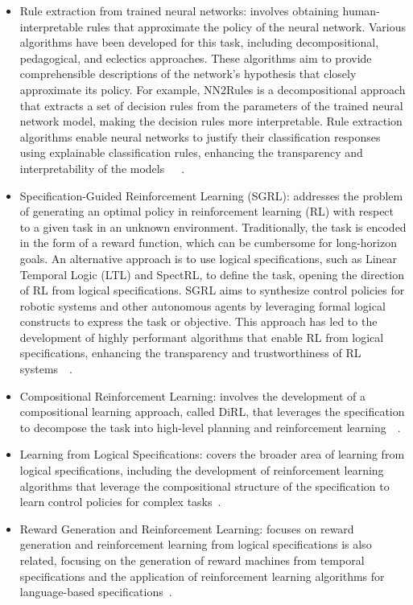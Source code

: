 \documentclass[runningheads]{llncs}
\begin{document}
\begin{itemize}
    \item Rule extraction from trained neural networks: involves obtaining human-interpretable rules that approximate the policy of the neural network. Various algorithms have been developed for this task, including decompositional, pedagogical, and eclectics approaches. These algorithms aim to provide comprehensible descriptions of the network's hypothesis that closely approximate its policy. For example, NN2Rules is a decompositional approach that extracts a set of decision rules from the parameters of the trained neural network model, making the decision rules more interpretable. Rule extraction algorithms enable neural networks to justify their classification responses using explainable classification rules, enhancing the transparency and interpretability of the models~\cite{Hailesilassie2016}~\cite{Sato2001}~\cite{Lal2022}.
    \item Specification-Guided Reinforcement Learning (SGRL): addresses the problem of generating an optimal policy in reinforcement learning (RL) with respect to a given task in an unknown environment. Traditionally, the task is encoded in the form of a reward function, which can be cumbersome for long-horizon goals. An alternative approach is to use logical specifications, such as Linear Temporal Logic (LTL) and SpectRL, to define the task, opening the direction of RL from logical specifications. SGRL aims to synthesize control policies for robotic systems and other autonomous agents by leveraging formal logical constructs to express the task or objective. This approach has led to the development of highly performant algorithms that enable RL from logical specifications, enhancing the transparency and trustworthiness of RL systems~\cite{Bansal2022}~\cite{Jothimurugan2023}.
    \item Compositional Reinforcement Learning: involves the development of a compositional learning approach, called DiRL, that leverages the specification to decompose the task into high-level planning and reinforcement learning~\cite{Bansal2022}~\cite{Jothimurugan2021}.
    \item Learning from Logical Specifications: covers the broader area of learning from logical specifications, including the development of reinforcement learning algorithms that leverage the compositional structure of the specification to learn control policies for complex tasks~\cite{Jothimurugan2021}.
    \item Reward Generation and Reinforcement Learning: focuses on reward generation and reinforcement learning from logical specifications is also related, focusing on the generation of reward machines from temporal specifications and the application of reinforcement learning algorithms for language-based specifications~\cite{Jothimurugan2021}.
\end{itemize}
\end{document}

